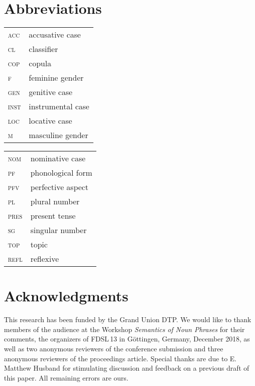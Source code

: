 \documentclass[output=paper]{langscibook}
\begin{document}
\section*{Abbreviations}

\begin{tabularx}{.5\textwidth}{@{}lX@{}}
\textsc{acc}&{accusative case}\\
\textsc{cl}&{classifier}\\
\textsc{cop}&{copula}\\
\textsc{f}&{feminine gender}\\
\textsc{gen}&{genitive case}\\
\textsc{inst}&{instrumental case}\\
\textsc{loc}&{locative case}\\
\textsc{m}&{masculine gender}\\
\end{tabularx}%
\begin{tabularx}{.5\textwidth}{@{}lX@{}}
\textsc{nom}&{nominative case}\\
\textsc{\textsc{pf}}&{phonological form}\\
\textsc{pfv}&{perfective aspect}\\
\textsc{pl}&{plural number}\\
\textsc{pres}&{present tense}\\
\textsc{sg}&{singular number}\\
\textsc{top}&{topic}\\
\textsc{refl}&{reflexive}\\
\end{tabularx}

\section*{Acknowledgments}
This research has been funded by the Grand Union DTP. We would like to thank members of the audience at the Workshop \emph{Semantics of Noun Phrases} for their comments, the organizers of FDSL\,13 in Göttingen, Germany, December 2018, as well as two anonymous reviewers of the conference submission and three anonymous reviewers of the proceedings article. Special thanks are due to E. Matthew Husband for stimulating discussion and feedback on a previous draft of this paper. All remaining errors are ours.

{\sloppy\printbibliography[heading=subbibliography,notkeyword=this]}
\end{document}
